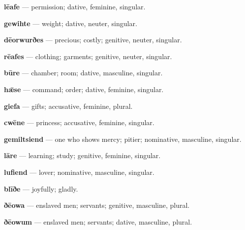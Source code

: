 \textbf{lēafe} — permission; dative, feminine, singular.

\textbf{gewihte} — weight; dative, neuter, singular.

\textbf{dēorwurðes} — precious; costly; genitive, neuter, singular.

\textbf{rēafes} — clothing; garments; genitive, neuter, singular.

\textbf{būre} — chamber; room; dative, masculine, singular.

\textbf{hǣse} — command; order; dative, feminine, singular.

\textbf{giefa} — gifts; accusative, feminine, plural.

\textbf{cwēne} — princess; accusative, feminine, singular.

\textbf{gemiltsiend} — one who shows mercy; pitier; nominative, masculine, singular.

\textbf{lāre} — learning; study; genitive, feminine, singular.

\textbf{lufiend} — lover; nominative, masculine, singular.

\textbf{blīðe} — joyfully; gladly.

\textbf{ðēowa} — enslaved men; servants; genitive, masculine, plural.

\textbf{ðēowum} — enslaved men; servants; dative, masculine, plural.

